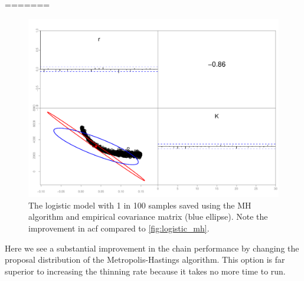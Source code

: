 \documentclass{article}\usepackage[]{graphicx}\usepackage[]{color}
\begin{document}
=======

\begin{figure}[h]
  \centering
  \includegraphics[width=5in]{../plots/logistic_mh2.pdf}
  \caption{The logistic model with 1 in 100 samples saved
    using the MH algorithm and empirical covariance matrix
    (blue ellipse). Note the improvement in acf compared to
    \ref{fig:logistic_mh}.}
  \label{fig:logistic_mh2}
\end{figure}
Here we see a substantial improvement in the chain
performance by changing the proposal distribution of the
Metropolis-Hastings algorithm. This option is far superior
to increasing the thinning rate because it takes no more
time to run.
\end{document}
